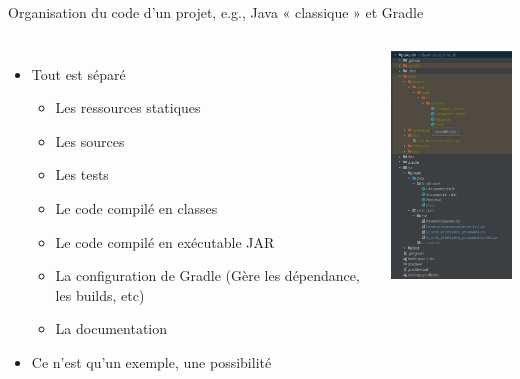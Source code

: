 \documentclass{beamer}
\begin{document}
    \begin{frame}{Organisation du code d'un projet, e.g., Java « classique » et Gradle }

        \begin{columns}

            \begin{itemize}

                \item Tout est séparé
                \begin{itemize}
                    \item Les ressources statiques
                    \item Les sources
                    \item Les tests
                    \item Le code compilé en classes
                    \item Le code compilé en exécutable JAR
                    \item La configuration de Gradle (Gère les dépendance, les builds, etc)
                    \item La documentation
                \end{itemize}
                \item Ce n'est qu'un exemple, une possibilité

            \end{itemize}


            \centering
            \includegraphics[width=4cm]{image/java-gradle-project-structure}

        \end{columns}

    \end{frame}
\end{document}
